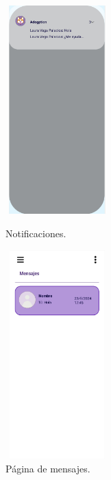 \documentclass[a4paper, 12pt]{article}
\begin{document}
\begin{figure}[H]
   	\begin{minipage}{0.48\textwidth}
		\begin{center}
			{\includegraphics[height=8cm, width=4cm]{design/Notification.jpg}\par}
			\caption{Notificaciones.}
			\medskip
		\end{center}  
	\end{minipage}\hfill
   	\begin{minipage}{0.48\textwidth}
		\begin{center}
			{\includegraphics[height=8cm, width=4cm]{design/Messages.jpg}\par}
			\caption{Página de mensajes.}
			\medskip
		\end{center}  
	\end{minipage}\hfill
\end{figure}
\end{document}
